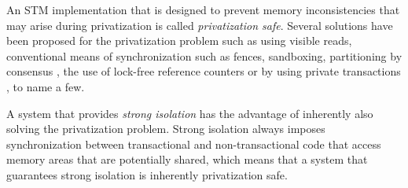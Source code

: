 \documentclass[runningheads,a4paper]{llncs}
\begin{document}


An STM implementation that is designed to prevent memory inconsistencies 
that may arise during privatization is called {\it privatization 
safe}. Several solutions have been proposed for the privatization problem 
such as using visible reads, conventional means of synchronization 
such as fences, sandboxing, partitioning by consensus 
\cite{scott07}, the use of lock-free 
reference   counters   \cite{afek10}  or   by  using
private transactions \cite{dice10}, to name a few. 

A system that provides {\it strong isolation} has the advantage of
inherently also solving the privatization problem. 
Strong isolation always imposes synchronization between 
transactional and non-transactional code that access memory areas that 
are potentially shared, which means that a system that guarantees strong 
isolation is inherently privatization safe.
\end{document}
